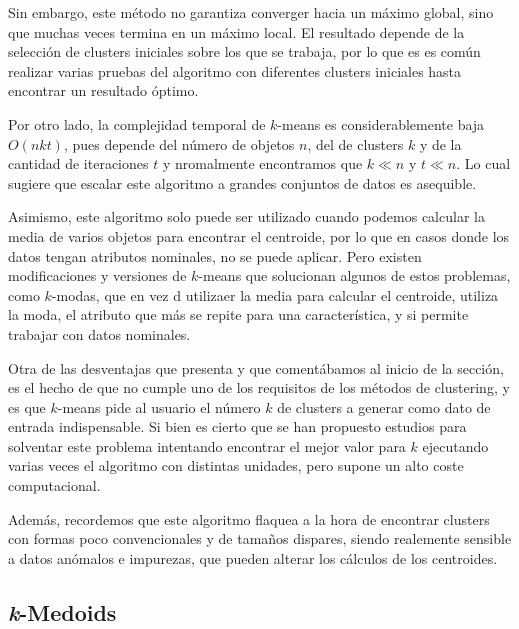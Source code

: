 \documentclass[3p,twocolumn]{elsarticle}
\begin{document}
Sin embargo, este método no garantiza converger hacia un máximo global, sino que muchas veces termina en un máximo local. El resultado depende de la selección de clusters iniciales sobre los que se trabaja, por lo que es es común realizar varias pruebas del algoritmo con diferentes clusters iniciales hasta encontrar un resultado óptimo. 

Por otro lado, la complejidad temporal de $k$-means es considerablemente baja  $O(nkt)$, pues depende del número de objetos $n$, del de clusters $k$ y de la cantidad de iteraciones $t$ y nromalmente encontramos que $k \ll n$ y $t \ll n$. Lo cual sugiere que escalar este algoritmo a grandes conjuntos de datos es asequible.

Asimismo, este algoritmo solo puede ser utilizado cuando podemos calcular la media de varios objetos para encontrar el centroide, por lo que en casos donde los datos tengan atributos nominales, no se puede aplicar. Pero existen modificaciones y versiones de $k$-means que solucionan algunos de estos problemas, como $k$-modas, que en vez d utilizaer la media para calcular el centroide, utiliza la moda, el atributo que más se repite para una característica, y si permite trabajar con datos nominales.

Otra de las desventajas que presenta y que comentábamos al inicio de la sección, es el hecho de que no cumple uno de los requisitos de los métodos de clustering, y es que $k$-means pide al usuario el número $k$ de clusters a generar como dato de entrada indispensable. Si bien es cierto que se han propuesto estudios para solventar este problema intentando encontrar el mejor valor para $k$ ejecutando varias veces el algoritmo con distintas unidades, pero supone un alto coste computacional. 

Además, recordemos que este algoritmo flaquea a la hora de encontrar clusters con formas poco convencionales y de tamaños dispares, siendo realemente sensible a datos anómalos e impurezas, que pueden alterar los cálculos de los centroides.




\subsection{\textbf{\textit{k}-Medoids}} \label{subsec:k-Medoids}
\end{document}

